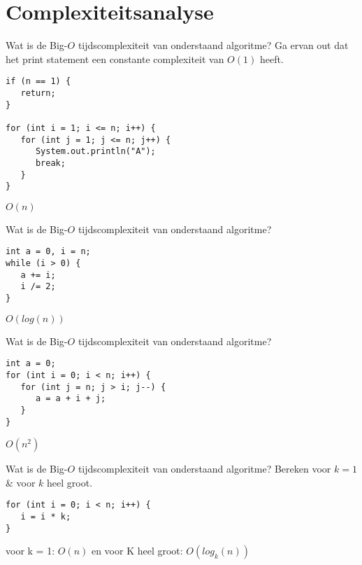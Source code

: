 \chapter{Complexiteitsanalyse}

\begin{oef}
\papier Wat is de Big-\(O\) tijdscomplexiteit van onderstaand algoritme? Ga ervan out dat het print statement een constante complexiteit van \(O(1)\) heeft.

\begin{lstlisting}
if (n == 1) {
   return;
}
   
for (int i = 1; i <= n; i++) {
   for (int j = 1; j <= n; j++) {
      System.out.println("A");
      break;
   }
}

\end{lstlisting}

\begin{opl}
\(O(n)\)
\end{opl}
\end{oef}

\begin{oef}
\papier Wat is de Big-\(O\) tijdscomplexiteit van onderstaand algoritme?

\begin{lstlisting}
int a = 0, i = n;
while (i > 0) {
   a += i;
   i /= 2;
}
\end{lstlisting}

\begin{opl}
\(O(log(n))\)
\end{opl}
\end{oef}

\break

\begin{oef}
\papier Wat is de Big-\(O\) tijdscomplexiteit van onderstaand algoritme?

\begin{lstlisting}
int a = 0;
for (int i = 0; i < n; i++) {
   for (int j = n; j > i; j--) {
      a = a + i + j;
   }
}
\end{lstlisting}

\begin{opl}
\(O(n^2)\)
\end{opl}
\end{oef}

\begin{oef}
\papier Wat is de Big-\(O\) tijdscomplexiteit van onderstaand algoritme? Bereken voor \(k = 1\) \& voor \(k\) heel groot.

\begin{lstlisting}
for (int i = 0; i < n; i++) {
   i = i * k;
}
\end{lstlisting}

\begin{opl}
voor k = 1: \(O(n)\) en 
voor K heel groot: \(O(log_k(n))\)
\end{opl}
\end{oef}

